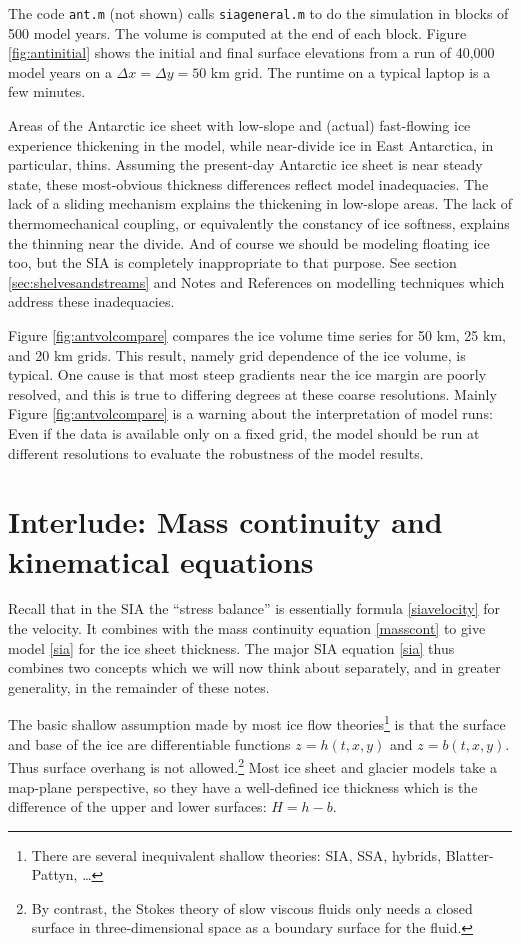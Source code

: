 \documentclass[letterpaper,final,12pt,reqno]{amsart}
\begin{document}
The code \texttt{ant.m} (not shown) calls \texttt{siageneral.m} to do the simulation in blocks of 500 model years.  The volume is computed at the end of each block.  Figure \ref{fig:antinitial} shows the initial and final surface elevations from a run of 40,000 model years on a $\Delta x = \Delta y = 50$ km grid.  The runtime on a typical laptop is a few minutes.

Areas of the Antarctic ice sheet with low-slope and (actual) fast-flowing ice experience thickening in the model, while near-divide ice in East Antarctica, in particular, thins.  Assuming the present-day Antarctic ice sheet is near steady state, these most-obvious thickness differences reflect model inadequacies.  The lack of a sliding mechanism explains the thickening in low-slope areas.  The lack of thermomechanical coupling, or equivalently the constancy of ice softness, explains the thinning near the divide.  And of course we should be modeling floating ice too, but the SIA is completely inappropriate to that purpose.  See section \ref{sec:shelvesandstreams} and Notes and References on modelling techniques which address these inadequacies.

Figure \ref{fig:antvolcompare} compares the ice volume time series for 50 km, 25 km, and 20 km grids.  This result, namely grid dependence of the ice volume, is typical.  One cause is that most steep gradients near the ice margin are poorly resolved, and this is true to differing degrees at these coarse resolutions.  Mainly Figure \ref{fig:antvolcompare} is a warning about the interpretation of model runs:  Even if the data is available only on a fixed grid, the model should be run at different resolutions to evaluate the robustness of the model results.


\section{Interlude: Mass continuity and kinematical equations}

Recall that in the SIA the ``stress balance'' is essentially formula \eqref{siavelocity} for the velocity.  It combines with the mass continuity equation \eqref{masscont} to give model \eqref{sia} for the ice sheet thickness.  The major SIA equation \eqref{sia} thus combines two concepts which we will now think about separately, and in greater generality, in the remainder of these notes.

The basic shallow assumption made by most ice flow theories\footnote{There are several inequivalent shallow theories: SIA, SSA, hybrids, Blatter-Pattyn, \dots} is that the surface and base of the ice are differentiable functions $z=h(t,x,y)$ and $z=b(t,x,y)$.  Thus surface overhang is not allowed.\footnote{By contrast, the Stokes theory of slow viscous fluids only needs a closed surface in three-dimensional space as a boundary surface for the fluid.}  Most ice sheet and glacier models take a map-plane perspective, so they have a well-defined ice thickness which is the difference of the upper and lower surfaces: $H=h-b$.
\end{document}
